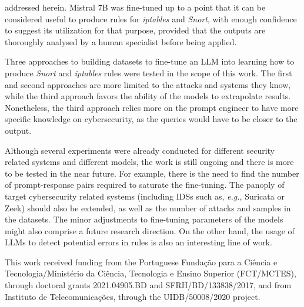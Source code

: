 \documentclass[sigconf]{acmart}
\begin{document}
addressed herein. Mistral 7B was fine-tuned up to a point that it can be considered useful to produce rules for \textit{iptables} and \textit{Snort}, with enough confidence to suggest its utilization for that purpose, provided that the outputs are thoroughly analysed by a human specialist before being applied.

Three approaches to building datasets to fine-tune an LLM into learning how to produce \textit{Snort} and \textit{iptables} rules were tested in the scope of this work. The first and second approaches are more limited to the attacks and systems they know, while the third approach favors the ability of the models to extrapolate results. Nonetheless, the third approach relies more on the prompt engineer to have more specific knowledge on cybersecurity, as the queries would have to be closer to the output.

Although several experiments were already conducted for different security related systems and different models, the work is still ongoing and there is more to be tested in the near future. For example, there is the need to find the number of prompt-response pairs required to saturate the fine-tuning. The panoply of target cybersecurity related systems (including IDSs such as, \textit{e.g.}, Suricata or Zeek) should also be extended, as well as the number of attacks and samples in the datasets. The minor adjustments to fine-tuning parameters of the models might also comprise a future research direction. On the other hand, the usage of LLMs to detect potential errors in rules is also an interesting line of work.

\begin{acks}
This work received funding from the Portuguese Fundação para a Ciência e Tecnologia/Ministério da Ciência, Tecnologia e Ensino Superior (FCT/MCTES), through doctoral grants 2021.04905.BD and SFRH/BD/133838/2017, and from Instituto de Telecomunicações, through the UIDB/50008/2020 project.
\end{acks}



\end{document}
